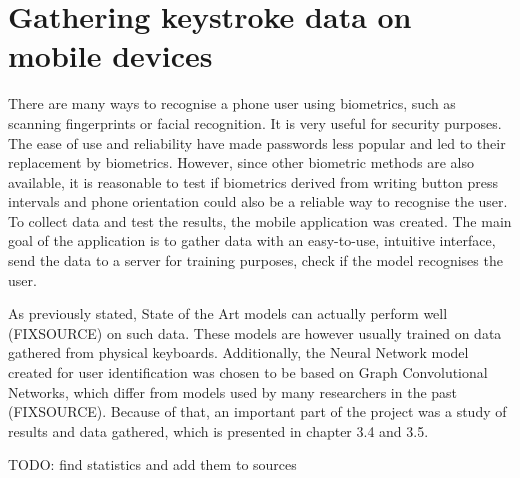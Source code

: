 
\chapter{Gathering keystroke data on mobile devices}

There are many ways to recognise a phone user using biometrics, such as scanning fingerprints or facial recognition. It is very useful for security purposes. The ease of use and reliability have made passwords less popular and led to their replacement by biometrics. However, since other biometric methods are also available, it is reasonable to test if biometrics derived from writing button press intervals and phone orientation could also be a reliable way to recognise the user. To collect data and test the results, the mobile application was created.
The main goal of the application is to gather data with an easy-to-use, intuitive interface, send the data to a server for training purposes, check if the model recognises the user. 

As previously stated, State of the Art models can actually perform well (FIXSOURCE) on such data. These models are however usually trained on data gathered from physical keyboards. Additionally, the Neural Network model created for user identification was chosen to be based on Graph Convolutional Networks, which differ from models used by many researchers in the past (FIXSOURCE).
Because of that, an important part of the project was a study of results and data gathered, which is presented in chapter 3.4 and 3.5.

TODO: find statistics and add them to sources